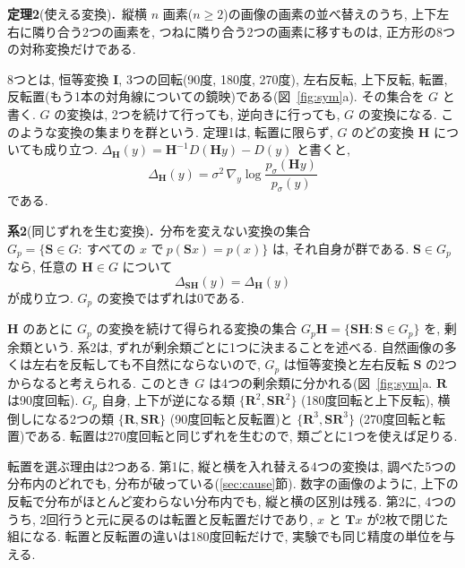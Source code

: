 \documentclass[MIRU,submit]{miru2025j}
\newcommand{\Tm}{\mathbf{T}}            %
\newcommand{\Hm}{\mathbf{H}}            %
\newcommand{\Sm}{\mathbf{S}}\newcommand{\Rm}{\mathbf{R}}\renewcommand{\Im}{\mathbf{I}}   %
\newcommand{\thm}[2]{\par\vspace{0.6mm}\noindent\textbf{#1}#2\textbf{.}\ }             %
\begin{document}
\thm{定理2}{(使える変換)}縦横 $n$ 画素($n\geq 2$)の画像の画素の並べ替えのうち, 上下左右に隣り合う2つの画素を, つねに隣り合う2つの画素に移すものは, 正方形の8つの対称変換だけである.\par\vspace{0.6mm}

8つとは, 恒等変換 $\Im$, 3つの回転(90度, 180度, 270度), 左右反転, 上下反転, 転置, 反転置(もう1本の対角線についての鏡映)である(図~\ref{fig:sym}a). その集合を $G$ と書く. $G$ の変換は, 2つを続けて行っても, 逆向きに行っても, $G$ の変換になる. このような変換の集まりを群という. 定理1は, 転置に限らず, $G$ のどの変換 $\Hm$ についても成り立つ. $\Delta_{\Hm}(y)=\Hm^{-1}D(\Hm y)-D(y)$ と書くと,
\begin{equation}
\Delta_{\Hm}(y)=\sigma^{2}\,\nabla_{y}\log\frac{p_\sigma(\Hm y)}{p_\sigma(y)}
\label{eq:thmH}
\end{equation}
である.

\thm{系2}{(同じずれを生む変換)}分布を変えない変換の集合 $G_p=\{\Sm\in G:\ \text{すべての $x$ で}\ p(\Sm x)=p(x)\}$ は, それ自身が群である. $\Sm\in G_p$ なら, 任意の $\Hm\in G$ について
\begin{equation}
\Delta_{\Sm\Hm}(y)=\Delta_{\Hm}(y)
\label{eq:coset}
\end{equation}
が成り立つ. $G_p$ の変換ではずれは0である.\par\vspace{0.6mm}

$\Hm$ のあとに $G_p$ の変換を続けて得られる変換の集合 $G_p\Hm=\{\Sm\Hm:\Sm\in G_p\}$ を, 剰余類という. 系2は, ずれが剰余類ごとに1つに決まることを述べる. 自然画像の多くは左右を反転しても不自然にならないので, $G_p$ は恒等変換と左右反転 $\Sm$ の2つからなると考えられる. このとき $G$ は4つの剰余類に分かれる(図~\ref{fig:sym}a. $\Rm$ は90度回転). $G_p$ 自身, 上下が逆になる類 $\{\Rm^{2},\Sm\Rm^{2}\}$ (180度回転と上下反転), 横倒しになる2つの類 $\{\Rm,\Sm\Rm\}$ (90度回転と反転置)と $\{\Rm^{3},\Sm\Rm^{3}\}$ (270度回転と転置)である. 転置は270度回転と同じずれを生むので, 類ごとに1つを使えば足りる.

転置を選ぶ理由は2つある. 第1に, 縦と横を入れ替える4つの変換は, 調べた5つの分布内のどれでも, 分布が破っている(\ref{sec:cause}節). 数字の画像のように, 上下の反転で分布がほとんど変わらない分布内でも, 縦と横の区別は残る. 第2に, 4つのうち, 2回行うと元に戻るのは転置と反転置だけであり, $x$ と $\Tm x$ が2枚で閉じた組になる. 転置と反転置の違いは180度回転だけで, 実験でも同じ精度の単位を与える.
\end{document}
